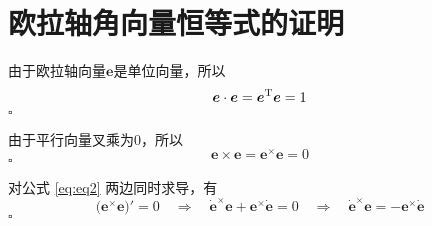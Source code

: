 \section{欧拉轴角向量恒等式的证明}
\label{欧拉轴角向量恒等式的证明}
\sssection[$\bm{e}^\T \bm{e} = 1$]
\vspace*{-0.8em}

\proof 由于欧拉轴向量$\bm{e}$是单位向量，所以
\begin{equation}
	\bm{e} \cdot \bm{e} = \bm{e}^{\text{T}} \bm{e} = 1
\end{equation}
\hfill $\square$


\sssection[$\bm{e}^\times \bm{e} = 0$]
\vspace*{-0.8em}

\proof 由于平行向量叉乘为0，所以
\begin{equation}
	\bm{e} \times \bm{e} = \bm{e}^\times \bm{e} = 0
	\label{eq:eq2}
\end{equation}
\hfill $\square$


\sssection[$\bm{e}^\times \bm{e} = 0$]
\vspace*{-0.8em}

\proof 对公式 \eqref{eq:eq2} 两边同时求导，有
\begin{equation}
	\big( \bm{e}^\times \bm{e} \big)' = 0 \quad \Rightarrow \quad \dot{\bm{e}}^\times \bm{e} + \bm{e}^\times \dot{\bm{e}} = 0 \quad \Rightarrow \quad \dot{\bm{e}}^\times \bm{e} =  -\bm{e}^\times \dot{\bm{e}}
\end{equation}
\hfill $\square$


\sssection[$\dot{\bm{e}^\times} \bm{e}^\times = \bm{e}\dot{\bm{e}}^\T$]
\vspace*{-0.8em}

